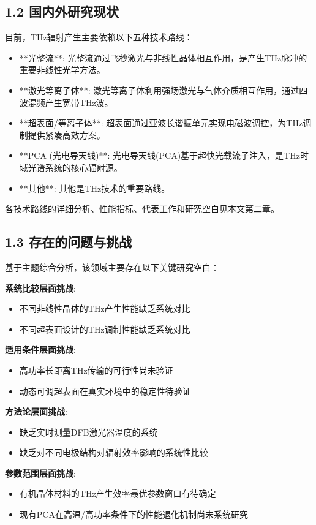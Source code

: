 \documentclass[12pt]{article}
\begin{document}
\subsection{1.2 国内外研究现状}

目前，THz辐射产生主要依赖以下五种技术路线：
\begin{itemize}
\item **光整流**: 光整流通过飞秒激光与非线性晶体相互作用，是产生THz脉冲的重要非线性光学方法。
\item **激光等离子体**: 激光等离子体利用强场激光与气体介质相互作用，通过四波混频产生宽带THz波。
\item **超表面/等离子体**: 超表面通过亚波长谐振单元实现电磁波调控，为THz调制提供紧凑高效方案。
\item **PCA (光电导天线)**: 光电导天线(PCA)基于超快光载流子注入，是THz时域光谱系统的核心辐射源。
\item **其他**: 其他是THz技术的重要路线。
\end{itemize}

各技术路线的详细分析、性能指标、代表工作和研究空白见本文第二章。

\subsection{1.3 存在的问题与挑战}

基于主题综合分析，该领域主要存在以下关键研究空白：

\textbf{系统比较层面挑战}:
\begin{itemize}
\item 不同非线性晶体的THz产生性能缺乏系统对比
\item 不同超表面设计的THz调制性能缺乏系统对比
\end{itemize}

\textbf{适用条件层面挑战}:
\begin{itemize}
\item 高功率长距离THz传输的可行性尚未验证
\item 动态可调超表面在真实环境中的稳定性待验证
\end{itemize}

\textbf{方法论层面挑战}:
\begin{itemize}
\item 缺乏实时测量DFB激光器温度的系统
\item 缺乏对不同电极结构对辐射效率影响的系统性比较
\end{itemize}

\textbf{参数范围层面挑战}:
\begin{itemize}
\item 有机晶体材料的THz产生效率最优参数窗口有待确定
\item 现有PCA在高温/高功率条件下的性能退化机制尚未系统研究
\end{itemize}
\end{document}
